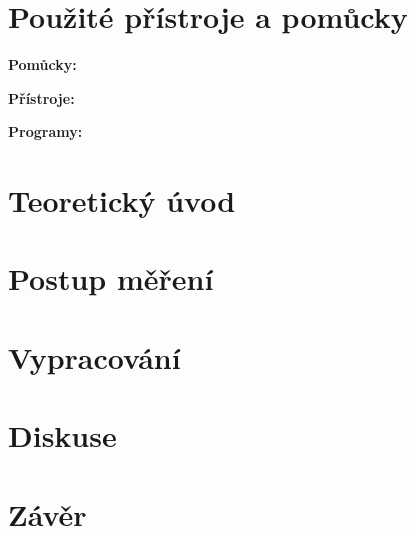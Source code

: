 \section{Použité přístroje a pomůcky}
\textbf{Pomůcky:} \par 
\textbf{Přístroje:} \par 
\textbf{Programy:} \par

\section{Teoretický úvod}
	\section{Postup měření}
			
			

					
			
		\section{Vypracování}
					
			
\section{Diskuse}
\section{Závěr}


